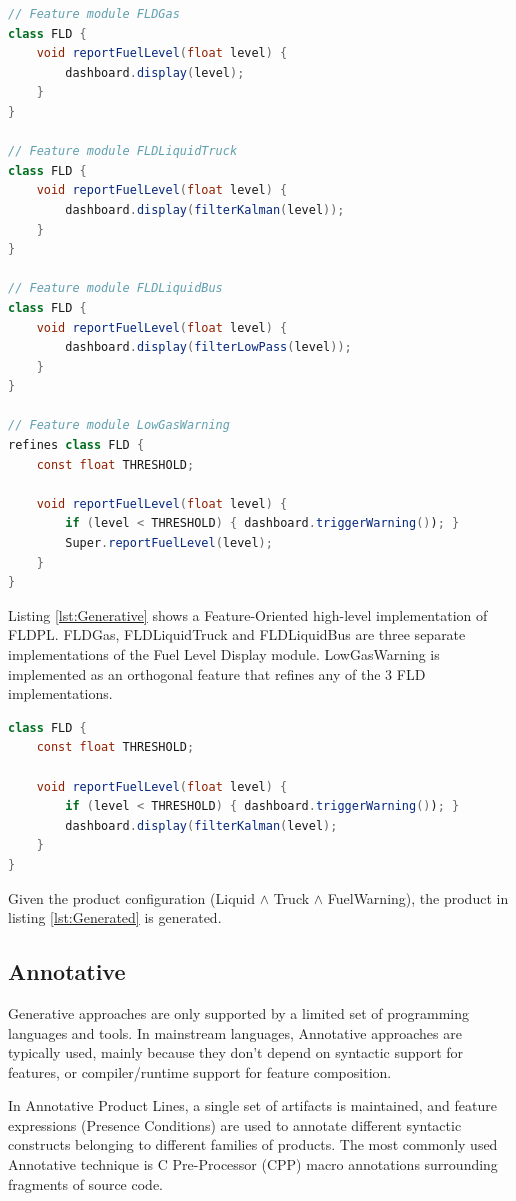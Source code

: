 \documentclass[11pt]{article}
\begin{document}
\begin{lstlisting}[language=Java, caption=Generative FLDPL, label={lst:Generative}, float]
// Feature module FLDGas
class FLD {
	void reportFuelLevel(float level) { 
		dashboard.display(level); 
	}
}

// Feature module FLDLiquidTruck
class FLD {
	void reportFuelLevel(float level) { 
		dashboard.display(filterKalman(level)); 
	}
}

// Feature module FLDLiquidBus
class FLD {
	void reportFuelLevel(float level) { 
		dashboard.display(filterLowPass(level)); 
	}
}

// Feature module LowGasWarning
refines class FLD {
	const float THRESHOLD;

	void reportFuelLevel(float level) { 
		if (level < THRESHOLD) { dashboard.triggerWarning()); }
		Super.reportFuelLevel(level);
	}
} 
\end{lstlisting}

Listing \ref{lst:Generative} shows a Feature-Oriented high-level implementation of FLDPL. FLDGas, FLDLiquidTruck and FLDLiquidBus are three separate implementations of the Fuel Level Display module. LowGasWarning is implemented as an orthogonal feature that refines any of the 3 FLD implementations. 

\begin{lstlisting}[language=Java, caption=Generated FLD Product, label={lst:Generated}, float]
class FLD {
	const float THRESHOLD;

	void reportFuelLevel(float level) { 
		if (level < THRESHOLD) { dashboard.triggerWarning()); }
		dashboard.display(filterKalman(level);
	}
} 
\end{lstlisting}

Given the product configuration (Liquid $\wedge$ Truck $\wedge$ FuelWarning), the product in listing \ref{lst:Generated} is generated.

\subsection{Annotative}

Generative approaches are only supported by a limited set of programming languages and tools. In mainstream languages, Annotative approaches are typically used, mainly because they don't depend on syntactic support for features, or compiler/runtime support for feature composition.

In Annotative Product Lines, a single set of artifacts is maintained, and feature expressions (Presence Conditions) are used to annotate different syntactic constructs belonging to different families of products. The most commonly used Annotative technique is C Pre-Processor (CPP) macro annotations surrounding fragments of source code.
\end{document}

